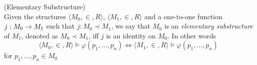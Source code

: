\begin{definition}{(Elementary Substructure)}\label{def:elementary_substructure}\\
Given the structures $\langle M_0, \in, R \rangle$, $\langle M_1, \in, R \rangle$ and a one-to-one function $j: M_0 \rightarrow M_1$ such that $j: M_0 \prec M_1$, we say that $M_0$ is an \emph{elementary substructure} of $M_1$, denoted as $M_0 \prec M_1$, iff $j$ is an identity on $M_0$. In other words
\begin{equation}
\langle M_0, \in, R \rangle \models \varphi(p_1, \ldots, p_n) \iff \langle M_1, \in, R \rangle  \models \varphi(p_1, \ldots, p_n)
\end{equation}
for $p_1, \ldots, p_n \in M_0$
\end{definition}

